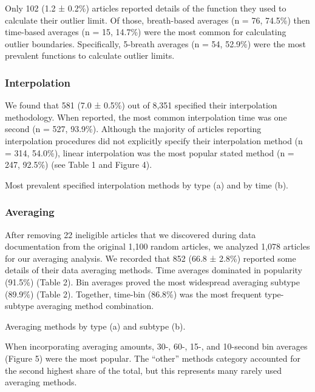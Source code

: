 \documentclass[
  letterpaper,
  DIV=11,
  numbers=noendperiod]{scrartcl}
\begin{document}
Only 102 (1.2 ± 0.2\%) articles reported details of the function they
used to calculate their outlier limit. Of those, breath-based averages
(n = 76, 74.5\%) then time-based averages (n = 15, 14.7\%) were the most
common for calculating outlier boundaries. Specifically, 5-breath
averages (n = 54, 52.9\%) were the most prevalent functions to calculate
outlier limits.

\subsubsection{Interpolation}\label{interpolation-2}

We found that 581 (7.0 ± 0.5\%) out of 8,351 specified their
interpolation methodology. When reported, the most common interpolation
time was one second (n = 527, 93.9\%). Although the majority of articles
reporting interpolation procedures did not explicitly specify their
interpolation method (n = 314, 54.0\%), linear interpolation was the
most popular stated method (n = 247, 92.5\%) (see Table 1 and Figure 4).

\begin{table}

\caption{\label{tbl-interpolation_time_type}Most prevalent specified
interpolation methods by type (a) and by time (b).}

\end{table}%

\subsubsection{Averaging}\label{averaging-2}

After removing 22 ineligible articles that we discovered during data
documentation from the original 1,100 random articles, we analyzed 1,078
articles for our averaging analysis. We recorded that 852 (66.8 ± 2.8\%)
reported some details of their data averaging methods. Time averages
dominated in popularity (91.5\%) (Table 2). Bin averages proved the most
widespread averaging subtype (89.9\%) (Table 2). Together, time-bin
(86.8\%) was the most frequent type-subtype averaging method
combination.

\begin{table}

\caption{\label{tbl-avg_type_subtype_tables}Averaging methods by type
(a) and subtype (b).}

\end{table}%

When incorporating averaging amounts, 30-, 60-, 15-, and 10-second bin
averages (Figure 5) were the most popular. The ``other'' methods
category accounted for the second highest share of the total, but this
represents many rarely used averaging methods.
\end{document}
